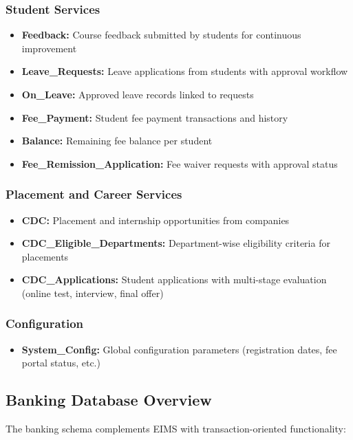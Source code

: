 \documentclass[12pt]{article}
\begin{document}
\subsubsection{Student Services}
\begin{itemize}
    \item \textbf{Feedback:} Course feedback submitted by students for continuous improvement
    \item \textbf{Leave\_Requests:} Leave applications from students with approval workflow
    \item \textbf{On\_Leave:} Approved leave records linked to requests
    \item \textbf{Fee\_Payment:} Student fee payment transactions and history
    \item \textbf{Balance:} Remaining fee balance per student
    \item \textbf{Fee\_Remission\_Application:} Fee waiver requests with approval status
\end{itemize}

\subsubsection{Placement and Career Services}
\begin{itemize}
    \item \textbf{CDC:} Placement and internship opportunities from companies
    \item \textbf{CDC\_Eligible\_Departments:} Department-wise eligibility criteria for placements
    \item \textbf{CDC\_Applications:} Student applications with multi-stage evaluation (online test, interview, final offer)
\end{itemize}

\subsubsection{Configuration}
\begin{itemize}
    \item \textbf{System\_Config:} Global configuration parameters (registration dates, fee portal status, etc.)
\end{itemize}

\subsection{Banking Database Overview}

The banking schema complements EIMS with transaction-oriented functionality:
\end{document}

